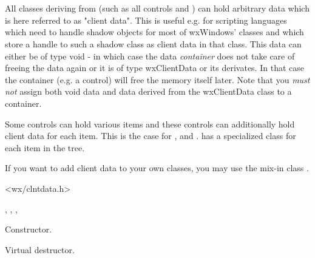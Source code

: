 \section{}\label{wxclientdata}

All classes deriving from 
(such as all controls and )
can hold arbitrary data which is here referred to as "client data".
This is useful e.g. for scripting languages which need to handle
shadow objects for most of wxWindows' classes and which store
a handle to such a shadow class as client data in that class.
This data can either be of type void - in which case the data
{\it container} does not take care of freeing the data again
or it is of type wxClientData or its derivates. In that case the
container (e.g. a control) will free the memory itself later.
Note that you {\it must not} assign both void data and data
derived from the wxClientData class to a container.

Some controls can hold various items and these controls can
additionally hold client data for each item. This is the case for
, 
and . 
has a specialized class 
for each item in the tree.

If you want to add client data to your own classes, you may
use the mix-in class .


<wx/clntdata.h>


, ,
, 



\label{wxclientdatawxclientdata}


Constructor.

\label{wxclientdatadtor}


Virtual destructor.

\section{}\label{wxclientdatacontainer}

